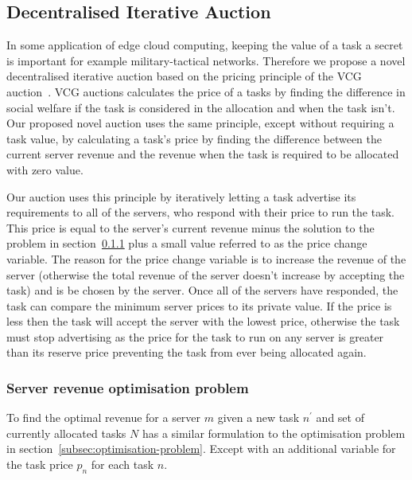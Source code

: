 \subsection{Decentralised Iterative Auction}\label{subsec:decentralised-iterative-auction}
In some application of edge cloud computing, keeping the value of a task a secret is important for example
military-tactical networks. Therefore we propose a novel decentralised iterative auction based on the pricing principle
of the VCG auction~\cite{vickrey,Clarke,groves}. VCG auctions calculates the price of a tasks by finding the
difference in social welfare if the task is considered in the allocation and when the task isn't. Our proposed novel
auction uses the same principle, except without requiring a task value, by calculating a task's price by finding the
difference between the current server revenue and the revenue when the task is required to be allocated with zero value.

Our auction uses this principle by iteratively letting a task advertise its requirements to all of the servers, who
respond with their price to run the task. This price is equal to the server's current revenue minus the solution to the
problem in section~\ref{subsubsec:decentralised-iterative-problem} plus a small value referred to as the price change
variable. The reason for the price change variable is to increase the revenue of the server (otherwise the total
revenue of the server doesn't increase by accepting the task) and is be chosen by the server. Once all of the servers
have responded, the task can compare the minimum server prices to its private value. If the price is less then the
task will accept the server with the lowest price, otherwise the task must stop advertising as the price for the task
to run on any server is greater than its reserve price preventing the task from ever being allocated again.

\subsubsection{Server revenue optimisation problem}\label{subsubsec:decentralised-iterative-problem}
To find the optimal revenue for a server $m$ given a new task $n^{'}$ and set of currently allocated tasks $N$ has a
similar formulation to the optimisation problem in section~\ref{subsec:optimisation-problem}. Except with an additional
variable for the task price $p_n$ for each task $n$.

